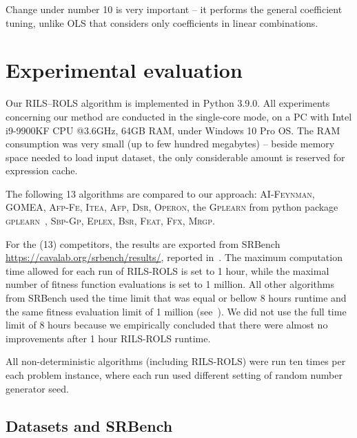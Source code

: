 \documentclass{bmcart}
\begin{document}
Change under number 10 is very important -- it performs the general coefficient tuning, unlike OLS that considers only coefficients in linear combinations.  

\section{Experimental evaluation}\label{sec:experiments}

Our \textsc{RILS}--\textsc{ROLS} algorithm is implemented in Python 3.9.0. All experiments concerning our method are conducted in the single-core mode, on a PC with Intel i9-9900KF CPU @3.6GHz, 64GB RAM, under Windows 10 Pro OS. The RAM consumption was very small (up to few hundred megabytes) -- beside memory space needed to load input dataset, the only considerable amount is reserved for expression cache. 


The following 13 algorithms are compared to our approach: \textsc{AI-Feynman}, \textsc{GOMEA}, \textsc{Afp-Fe}, \textsc{Itea}, \textsc{Afp}, \textsc{Dsr}, \textsc{Operon}, the \textsc{Gplearn} from python package \textsc{gplearn}~\cite{stephens2016genetic}, \textsc{Sbp-Gp}, \textsc{Eplex}, \textsc{Bsr}, \textsc{Feat}, \textsc{Ffx}, \textsc{Mrgp}. 

For the (13) competitors, the results are exported from SRBench \url{https://cavalab.org/srbench/results/}, reported in~\cite{la2021contemporary}. 
The maximum computation time allowed for each run of \textsc{RILS}-\textsc{ROLS} is set to 1 hour, while the maximal number of fitness function evaluations is set to 1 million. All other algorithms from SRBench used the time limit that was equal or bellow 8 hours runtime and the same fitness evaluation limit of 1 million (see~\cite{la2021contemporary}). We did not use the full time limit of 8 hours because we empirically concluded that there were almost no improvements after 1 hour \textsc{RILS}-\textsc{ROLS} runtime.

All non-deterministic algorithms (including \textsc{RILS}-\textsc{ROLS}) were run ten times per each problem instance, where each run used different setting of random number generator seed. 

\subsection{Datasets and SRBench}
\end{document}
